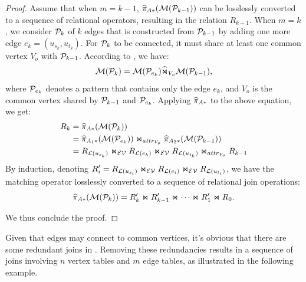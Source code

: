 \begin{proof}
Assume that when $m = k-1$, $\widehat{\pi}_{A*}(\mathcal{M}(\mathcal{P}_{k-1}))$ can be losslessly converted to a sequence of relational operators, resulting in the relation $R_{k-1}$. When $m = k$, we consider $\mathcal{P}_{k}$ of $k$ edges that is constructed from $\mathcal{P}_{k-1}$ by adding one more edge $e_k = (u_{s_k}, u_{t_k})$. For $\mathcal{P}_{k}$ to be connected, it must share at least one common vertex $V_o$ with $\mathcal{P}_{k-1}$. According to , we have:
\[ \mathcal{M}(\mathcal{P}_{k}) =  \mathcal{M}(\mathcal{P}_{e_k}) \widehat{\Join}_{V_o} \mathcal{M}(\mathcal{P}_{k-1}), \]
where $\mathcal{P}_{e_k}$ denotes a pattern that contains only the edge $e_k$, and $V_o$ is the common vertex shared by $\mathcal{P}_{k-1}$ and $\mathcal{P}_{e_k}$. Applying $\widehat{\pi}_{A*}$ to the above equation, we get:
\begin{equation*}
\begin{split}
R_k &= \widehat{\pi}_{A*}(\mathcal{M}(\mathcal{P}_{k})) \\
    &= \widehat{\pi}_{A_1*}(\mathcal{M}(\mathcal{P}_{e_k})) \Join_{attr_{V_o}}  \widehat{\pi}_{A_2*}(\mathcal{M}(\mathcal{P}_{k-1})) \\
    &= {R_{\mathcal{L}(u_{s_k})}} \Join_\mathcal{EV} {R_{\mathcal{L}(e_k)}} \Join_\mathcal{EV} {R_{\mathcal{L}(u_{t_k})}} \Join_{attr_{V_o}} R_{k-1}
\end{split}
\end{equation*}
By induction, denoting $R'_i = {R_{\mathcal{L}(u_{s_i})}} \Join_\mathcal{EV} {R_{\mathcal{L}(e_i)}} \Join_\mathcal{EV} {R_{\mathcal{L}(u_{t_i})}}$, we have the matching operator losslessly converted to a sequence of relational join operations:
\begin{equation}
    \label{eq:graph-agnostic}
    \widehat{\pi}_{A*}(\mathcal{M}(\mathcal{P}_{k})) = R'_k \Join R'_{k-1} \Join \cdots \Join R'_1 \Join R_0.
\end{equation}

We thus conclude the proof.
\end{proof}


Given that edges may connect to common vertices, it's obvious that there are some redundant joins in . Removing these redundancies results in a sequence of joins involving $n$ vertex tables and
$m$ edge tables, as illustrated in the following example.

